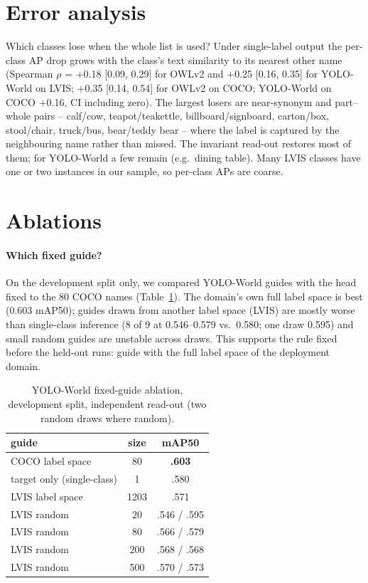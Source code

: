 \documentclass[10pt,twocolumn,letterpaper]{article}
\begin{document}
\section{Error analysis}
Which classes lose when the whole list is used? Under single-label output the per-class AP drop grows with the
class's text similarity to its nearest other name (Spearman $\rho$ = $+$0.18 [0.09, 0.29] for OWLv2 and $+$0.25
[0.16, 0.35] for YOLO-World on LVIS; $+$0.35 [0.14, 0.54] for OWLv2 on COCO; YOLO-World on COCO $+$0.16, CI
including zero). The largest losers are near-synonym and part--whole pairs -- calf/cow, teapot/teakettle,
billboard/signboard, carton/box, stool/chair, truck/bus, bear/teddy bear -- where the label is captured by the
neighbouring name rather than missed. The invariant read-out restores most of them; for YOLO-World a few remain
(e.g.\ dining table). Many LVIS classes have one or two instances in our sample, so per-class APs are coarse.

\section{Ablations}\label{sec:ablation}
\paragraph{Which fixed guide?} On the development split only, we compared YOLO-World guides with the head fixed to
the 80 COCO names (Table~\ref{tab:guide}). The domain's own full label space is best (0.603 mAP50); guides drawn
from another label space (LVIS) are mostly worse than single-class inference (8 of 9 at 0.546--0.579 vs.\ 0.580; one draw 0.595) and small random
guides are unstable across draws. This supports the rule fixed before the held-out runs: guide with the full label
space of the deployment domain.
\begin{table}[t]\centering\small
\caption{YOLO-World fixed-guide ablation, development split, independent read-out (two random draws where random).}\label{tab:guide}
\begin{tabular}{lcc}\toprule guide & size & mAP50\\\midrule
COCO label space & 80 & \textbf{.603}\\
target only (single-class) & 1 & .580\\
LVIS label space & 1203 & .571\\
LVIS random & 20 & .546 / .595\\
LVIS random & 80 & .566 / .579\\
LVIS random & 200 & .568 / .568\\
LVIS random & 500 & .570 / .573\\\bottomrule\end{tabular}\end{table}
\end{document}
